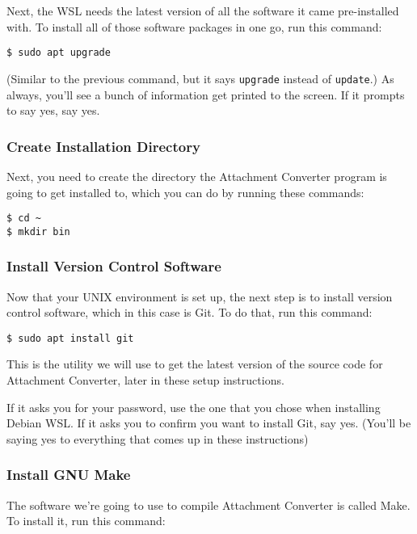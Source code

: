 \documentclass[11pt]{article}
\begin{document}
Next, the WSL needs the latest version of all the software it came
pre-installed with.  To install all of those software packages in one
go, run this command:

\begin{verbatim}
$ sudo apt upgrade
\end{verbatim}

(Similar to the previous command, but it says \texttt{upgrade} instead of
\texttt{update}.)  As always, you'll see a bunch of information get printed
to the screen.  If it prompts to say yes, say yes.

\subsubsection{Create Installation Directory}
\label{sec:org3cd909d}

Next, you need to create the directory the Attachment Converter
program is going to get installed to, which you can do by running
these commands:

\begin{verbatim}
$ cd ~
$ mkdir bin
\end{verbatim}

\subsubsection{Install Version Control Software}
\label{sec:orgb4d88c1}

Now that your UNIX environment is set up, the next step is to install
version control software, which in this case is Git.  To do that, run
this command:

\begin{verbatim}
$ sudo apt install git
\end{verbatim}

This is the utility we will use to get the latest version of the
source code for Attachment Converter, later in these setup
instructions.

If it asks you for your password, use the one that you chose when
installing Debian WSL.  If it asks you to confirm you want to install
Git, say yes.  (You'll be saying yes to everything that comes up in
these instructions)

\subsubsection{Install GNU Make}
\label{sec:org91b56e3}

The software we're going to use to compile Attachment Converter is
called Make.  To install it, run this command:
\end{document}
